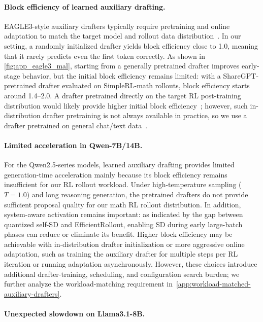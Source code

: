 \documentclass{llmxive}
\providecommand{\methodtitle}{EfficientRollout}
\providecommand{\alwayssd}{quantized self-SD}
\providecommand{\learned}{learned auxiliary drafting}
\providecommand{\MAL}{block efficiency}
\begin{document}
\paragraph{Block efficiency of \learned{}.}

EAGLE3-style auxiliary drafters typically require pretraining and online adaptation to match the target model and rollout data distribution~\citep{zhang2025fastgrpo, hu2026taming, iso2026accelerating}.
In our setting, a randomly initialized drafter yields \MAL{} close to 1.0, meaning that it rarely predicts even the first token correctly.
As shown in \cref{fig:app_eagle3_mal}, starting from a generally pretrained drafter improves early-stage behavior, but the initial \MAL{} remains limited: with a ShareGPT-pretrained drafter evaluated on SimpleRL-math rollouts, \MAL{} starts around 1.4--2.0.
A drafter pretrained directly on the target RL post-training distribution would likely provide higher initial \MAL{}~\citep{iso2026accelerating}; however, such in-distribution drafter pretraining is not always available in practice, so we use a drafter pretrained on general chat/text data~\citep{li2025eagle}.

\paragraph{Limited acceleration in Qwen-7B/14B.}

For the Qwen2.5-series models, learned auxiliary drafting provides limited generation-time acceleration mainly because its \MAL{} remains insufficient for our RL rollout workload.
Under high-temperature sampling ($T=1.0$) and long reasoning generation, the pretrained drafters do not provide sufficient proposal quality for our math RL rollout distribution.
In addition, system-aware activation remains important: as indicated by the gap between \alwayssd{} and \methodtitle{}, enabling SD during early large-batch phases can reduce or eliminate its benefit.
Higher \MAL{} may be achievable with in-distribution drafter initialization or more aggressive online adaptation, such as training the auxiliary drafter for multiple steps per RL iteration or running adaptation asynchronously.
However, these choices introduce additional drafter-training, scheduling, and configuration search burden; we further analyze the workload-matching requirement in~\cref{app:workload-matched-auxiliary-drafters}.

\paragraph{Unexpected slowdown on Llama3.1-8B.}
\end{document}
